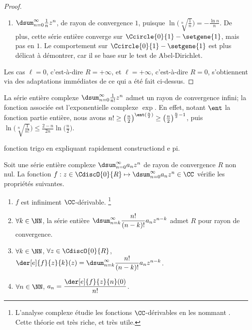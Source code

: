\begin{proof}
\begin{itemize}
\begin{enumerate}[label=(\alph*)]
	        \item $\dsum_{n=0}^{\infty}  \frac{1}{n} z^n$, 
	        de rayon de convergence $1$,
	        puisque 
	        $ \ln \big( \sqrt[n]{\frac{1}{n}} \big)
	        = -\frac{\ln n}{n}$.
	        De plus,
	        cette série entière converge sur $\Ccircle{0}{1} - \setgene{1}$, mais pas en $1$. 
	        Le comportement sur $\Ccircle{0}{1} - \setgene{1}$ est plus délicat à démontrer, car il se base sur le test de Abel-Dirichlet.
	    \end{enumerate}
    \end{itemize}


    Les cas
    $\ell = 0$, c'est-à-dire $R = +\infty$,
    et
    $\ell = +\infty$, c'est-à-dire $R = 0$,
    s'obtiennent via des adaptations immédiates de ce qui a été fait ci-dessus.
\end{proof}


\begin{example}
	La série entière complexe $\dsum_{n=0}^{\infty} \frac{1}{n!} z^n$ admet un rayon de convergence infini; la fonction associée est l'exponentielle complexe $\exp$.
	En effet,
	notant $\ent$ la fonction partie entière, nous avons
	$n! \geq \big( \frac{n}{2} \big)^{\ent (\frac{n}{2})} \geq \big( \frac{n}{2} \big)^{\frac{n}{2} - 1}$,
	puis
	$ \ln \big( \sqrt[n]{\frac{1}{n!}} \big)
	\leq
	  \frac{2 - n}{2 n} \ln \big( \frac{n}{2} \big)$.
\end{example}


\begin{example}
	fonction trigo en expliquant rapidement constructiond e pi.
\end{example}




\begin{preli} \label{der-power-serie}
    Soit une série entière complexe $\dsum_{n=0}^{\infty} a_n z^n$ de rayon de convergence $R$ non nul.
    La fonction $f: z \in \CdiscO{0}{R} \mapsto \dsum_{n=0}^{\infty} a_n z^n \in \CC$ vérifie les propriétés suivantes.
    \begin{enumerate}
    	\item $f$ est infiniment $\CC$-dérivable.%
		\footnote{
			L'analyse complexe étudie les fonctions $\CC$-dérivables en les nommant .
			Cette théorie est très riche, et très utile. 
		}

    	\item $\forall k \in \NN$,
		la série entière $\dsum_{n = k}^{\infty} \dfrac{n!}{(n-k)!} a_n z^{n - k}$ admet $R$ pour rayon de convergence.

    	\item $\forall k \in \NN$, $\forall z \in \CdiscO{0}{R}$,
		$\der[e]{f}{z}{k}(z) = \dsum_{n = k}^{\infty} \dfrac{n!}{(n-k)!} a_n z^{n - k}$.

    	\item \label{a_n-value}
		$\forall n \in \NN$,  $a_n = \dfrac{\der[e]{f}{z}{n}(0)}{n!}$.
    \end{enumerate}
\end{preli}



